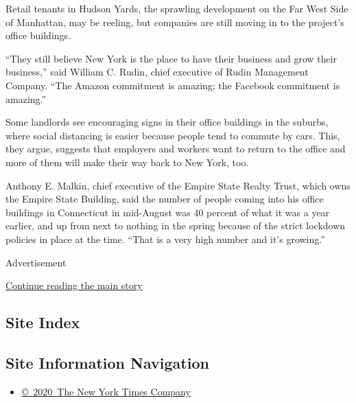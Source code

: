 Retail tenants in Hudson Yards, the sprawling development on the Far
West Side of Manhattan, may be reeling, but companies are still moving
in to the project's office buildings.

``They still believe New York is the place to have their business and
grow their business,'' said William C. Rudin, chief executive of Rudin
Management Company. ``The Amazon commitment is amazing; the Facebook
commitment is amazing.''

Some landlords see encouraging signs in their office buildings in the
suburbs, where social distancing is easier because people tend to
commute by cars. This, they argue, suggests that employers and workers
want to return to the office and more of them will make their way back
to New York, too.

Anthony E. Malkin, chief executive of the Empire State Realty Trust,
which owns the Empire State Building, said the number of people coming
into his office buildings in Connecticut in mid-August was 40 percent of
what it was a year earlier, and up from next to nothing in the spring
because of the strict lockdown policies in place at the time. ``That is
a very high number and it's growing.''

Advertisement

\protect\hyperlink{after-bottom}{Continue reading the main story}

\hypertarget{site-index}{%
\subsection{Site Index}\label{site-index}}

\hypertarget{site-information-navigation}{%
\subsection{Site Information
Navigation}\label{site-information-navigation}}

\begin{itemize}
\tightlist
\item
  \href{https://help.nytimes3xbfgragh.onion/hc/en-us/articles/115014792127-Copyright-notice}{©~2020~The
  New York Times Company}
\end{itemize}

